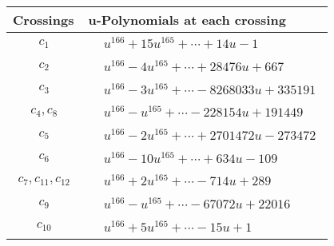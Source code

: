 \documentclass[1p]{elsarticle_modified}
\theoremstyle{definition}
\begin{document}
\begin{tabular}{m{50pt}|m{274pt}}
Crossings & \hspace{64pt}u-Polynomials at each crossing \\
\hline $$\begin{aligned}c_{1}\end{aligned}$$&$\begin{aligned}
&u^{166}+15 u^{165}+\cdots+14 u-1
\end{aligned}$\\
\hline $$\begin{aligned}c_{2}\end{aligned}$$&$\begin{aligned}
&u^{166}-4 u^{165}+\cdots+28476 u+667
\end{aligned}$\\
\hline $$\begin{aligned}c_{3}\end{aligned}$$&$\begin{aligned}
&u^{166}-3 u^{165}+\cdots-8268033 u+335191
\end{aligned}$\\
\hline $$\begin{aligned}c_{4},c_{8}\end{aligned}$$&$\begin{aligned}
&u^{166}- u^{165}+\cdots-228154 u+191449
\end{aligned}$\\
\hline $$\begin{aligned}c_{5}\end{aligned}$$&$\begin{aligned}
&u^{166}-2 u^{165}+\cdots+2701472 u-273472
\end{aligned}$\\
\hline $$\begin{aligned}c_{6}\end{aligned}$$&$\begin{aligned}
&u^{166}-10 u^{165}+\cdots+634 u-109
\end{aligned}$\\
\hline $$\begin{aligned}c_{7},c_{11},c_{12}\end{aligned}$$&$\begin{aligned}
&u^{166}+2 u^{165}+\cdots-714 u+289
\end{aligned}$\\
\hline $$\begin{aligned}c_{9}\end{aligned}$$&$\begin{aligned}
&u^{166}- u^{165}+\cdots-67072 u+22016
\end{aligned}$\\
\hline $$\begin{aligned}c_{10}\end{aligned}$$&$\begin{aligned}
&u^{166}+5 u^{165}+\cdots-15 u+1
\end{aligned}$\\
\hline
\end{tabular}\\~\\
\end{document}
